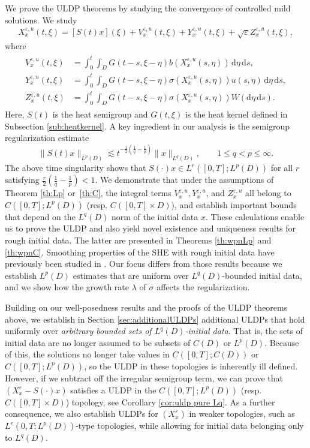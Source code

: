 \documentclass{amsart}
\theoremstyle{plain}
\theoremstyle{remark}
\theoremstyle{plain}
\numberwithin{equation}{section}
\newcommand{\eps}{\varepsilon}
\newcommand{\dd}{\,\mathrm{d}}
\newcommand{\ddd}{\mathrm{d}}
\begin{document}
We prove the ULDP theorems by studying the convergence of controlled mild solutions. We study
\begin{align*} 
  X_x^{\eps,u}(t,\xi) = [S(t)x](\xi)+V^{\eps,u}_x(t,\xi)+Y_x^{\eps,u}(t,\xi)+\sqrt{\eps}Z_x^{\eps,u}(t,\xi),
\end{align*}
where  
\begin{align*} 
\begin{split}
V^{\eps,u}_x(t,\xi) &=  
  \int_0^t \int_D G(t-s,\xi-\eta)b(X_x^{\eps,u}(s,\eta))\dd \eta\dd s, \\
  Y_x^{\eps,u}(t,\xi) &=  
  \int_0^t \int_D G(t-s,\xi-\eta)\sigma(X_x^{\eps,u}(s,\eta))u(s,\eta)\dd \eta\dd s, \\
  Z_x^{\eps,u}(t,\xi) &=   
  \int_0^t\int_D G(t-s,\xi-\eta)\sigma(X_x^{\eps,u}(s,\eta))W(\ddd\eta\dd s).\end{split}
\end{align*}
Here, $S(t)$ is the heat semigroup and $G(t,\xi)$ is the heat kernel defined in Subsection \ref{sub:heatkernel}. 
A key ingredient in our analysis is the semigroup regularization estimate  
\[\|S(t)x\|_{L^p(D)} \lesssim t^{-\frac{1}{2}(\frac{1}{q} - \frac{1}{p})}\|x\|_{L^q(D)}, \qquad 
 1\leq q< p \leq \infty
.\]
The above time singularity shows that $S(\cdot)x \in L^r([0,T];L^p(D))$ for all $r$ satisfying $\frac{r}{2}(\frac{1}{q} - \frac{1}{p})<1$.
We demonstrate that under the assumptions of Theorem  \ref{th:Lp} or\ \ref{th:C}, the integral terms $V^{\eps,u}_x, Y^{\eps,u}_x$, and $Z^{\eps,u}_x$ all belong to $C([0,T];L^p(D))$ (resp. $C([0,T]\times D)$), and establish important bounds that depend on the $L^q(D)$ norm of the initial data $x$. 
These calculations enable us to prove the ULDP and also yield novel existence and uniqueness results for rough initial data. The latter are presented in Theorems  \ref{th:wpnLp} and \ref{th:wpnC}. Smoothing properties of the SHE with rough initial data have previously been studied in  \cite{CD2014,CD2015,CH2019,CH2023,CCY2024,CK2019,FKN2025,SWZ2026,CX2026}. Our focus differs from  those results because we establish $L^p(D)$ estimates that are uniform over $L^q(D)$-bounded initial data, and we show how the growth rate $\lambda$ of $\sigma$ affects the regularization. 
 

Building on our well-posedness results and the proofs of the ULDP theorems above, we establish in Section \ref{sec:additionalULDPs} additional ULDPs that hold  uniformly over \emph{arbitrary  bounded sets of $L^q(D)$-initial data}. That is, the sets of initial data are no longer assumed to be subsets of  $C(D)$ or $L^p(D)$. Because of this, the solutions no longer take  values in  $C([0,T];C(D))$ or $C([0,T];L^p(D))$, so the ULDP in these topologies is inherently ill defined. However, if we subtract off the irregular semigroup term, we can prove that $(X^\eps_x - S(\cdot)x)$ satisfies a ULDP in the $C([0,T];L^p(D))$ (resp.\ $C([0,T]\times D)$) topology, see Corollary \ref{cor:uldp pure Lq}. As a further consequence,  
we also establish ULDPs for $(X^\eps_x)$ in weaker topologies, such as  $L^{r}( 0,T;L^p(D))$-type topologies, while allowing for initial data belonging only to $L^q(D)$. 
\end{document}
